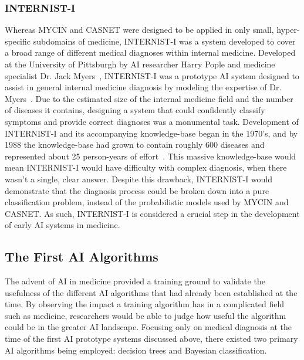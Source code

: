 \documentclass[a4paper]{article}
\begin{document}
\subsubsection{INTERNIST-I}

Whereas MYCIN and CASNET were designed to be applied in only small, hyper-specific subdomains of medicine, INTERNIST-I was a system developed to cover a broad range of different medical diagnoses within internal medicine. Developed at the University of Pittsburgh by AI researcher Harry Pople and medicine specialist Dr. Jack Myers~\cite{kulikowski_beginnings_2019}, INTERNIST-I was a prototype AI system designed to assist in general internal medicine diagnosis by modeling the expertise of Dr. Myers~\cite{wolfram_appraisal_1995}. Due to the estimated size of the internal medicine field and the number of diseases it contains, designing a system that could confidently classify symptoms and provide correct diagnoses was a monumental task. Development of INTERNIST-I and its accompanying knowledge-base began in the 1970's, and by 1988 the knowledge-base had grown to contain roughly 600 diseases and represented about 25 person-years of effort~\cite{wolfram_appraisal_1995}. This massive knowledge-base would mean INTERNIST-I would have difficulty with complex diagnosis, when there wasn't a single, clear answer. Despite this drawback, INTERNIST-I would demonstrate that the diagnosis process could be broken down into a pure classification problem, instead of the probabilistic models used by MYCIN and CASNET. As such, INTERNIST-I is considered a crucial step in the development of early AI systems in medicine.

\subsection{The First AI Algorithms}

The advent of AI in medicine provided a training ground to validate the usefulness of the different AI algorithms that had already been established at the time. By observing the impact a training algorithm has in a complicated field such as medicine, researchers would be able to judge how useful the algorithm could be in the greater AI landscape. Focusing only on medical diagnosis at the time of the first AI prototype systems discussed above, there existed two primary AI algorithms being employed: decision trees and Bayesian classification.  
\end{document}
